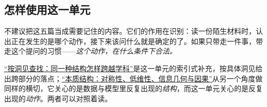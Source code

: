 \subsection{怎样使用这一单元}

不建议把这五篇当成需要记住的内容。它们的作用在识别：读一份陌生材料时，认出正在发生的是哪个动作，接下来该问什么就是确定的了。如果只带走一件事，带走这个提问的习惯——\emph{这个动作，在什么条件下合法。}

\hyperref[ch:139]{``按洞见查找：同一种结构怎样跨越学科''}是这一单元的索引式补充，按具体洞见给出跨部分的落点；\hyperref[ch:106]{``本质结构：对称性、低维性、信息几何与因果''}从另一个角度做同样的横切，它关心的是数据与模型里反复出现的\emph{结构}，而这一单元关心的是反复出现的\emph{动作}。两者可以对照着读。
